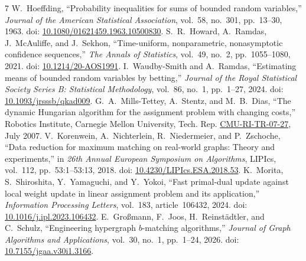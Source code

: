 \documentclass[11pt]{article}
\begin{document}
\begin{thebibliography}{7}
 W.~Hoeffding, ``Probability inequalities for sums of bounded random variables,'' \emph{Journal of the American Statistical Association}, vol.~58, no.~301, pp.~13--30, 1963. doi: \href{https://doi.org/10.1080/01621459.1963.10500830}{10.1080/01621459.1963.10500830}.
 S.~R.~Howard, A.~Ramdas, J.~McAuliffe, and J.~Sekhon, ``Time-uniform, nonparametric, nonasymptotic confidence sequences,'' \emph{The Annals of Statistics}, vol.~49, no.~2, pp.~1055--1080, 2021. doi: \href{https://doi.org/10.1214/20-AOS1991}{10.1214/20-AOS1991}.
 I.~Waudby-Smith and A.~Ramdas, ``Estimating means of bounded random variables by betting,'' \emph{Journal of the Royal Statistical Society Series B: Statistical Methodology}, vol.~86, no.~1, pp.~1--27, 2024. doi: \href{https://doi.org/10.1093/jrsssb/qkad009}{10.1093/jrsssb/qkad009}.
 G.~A.~Mills-Tettey, A.~Stentz, and M.~B.~Dias, ``The dynamic Hungarian algorithm for the assignment problem with changing costs,'' Robotics Institute, Carnegie Mellon University, Tech. Rep. \href{https://www.cs.cmu.edu/~gertrude/dyn_assign_techreport.pdf}{CMU-RI-TR-07-27}, July 2007.
 V.~Korenwein, A.~Nichterlein, R.~Niedermeier, and P.~Zschoche, ``Data reduction for maximum matching on real-world graphs: Theory and experiments,'' in \emph{26th Annual European Symposium on Algorithms}, LIPIcs, vol.~112, pp.~53:1--53:13, 2018. doi: \href{https://doi.org/10.4230/LIPIcs.ESA.2018.53}{10.4230/LIPIcs.ESA.2018.53}.
 K.~Morita, S.~Shiroshita, Y.~Yamaguchi, and Y.~Yokoi, ``Fast primal-dual update against local weight update in linear assignment problem and its application,'' \emph{Information Processing Letters}, vol.~183, article~106432, 2024. doi: \href{https://doi.org/10.1016/j.ipl.2023.106432}{10.1016/j.ipl.2023.106432}.
 E.~Gro{\ss}mann, F.~Joos, H.~Reinst{\"a}dtler, and C.~Schulz, ``Engineering hypergraph $b$-matching algorithms,'' \emph{Journal of Graph Algorithms and Applications}, vol.~30, no.~1, pp.~1--24, 2026. doi: \href{https://doi.org/10.7155/jgaa.v30i1.3166}{10.7155/jgaa.v30i1.3166}.
\end{thebibliography}
\end{document}
